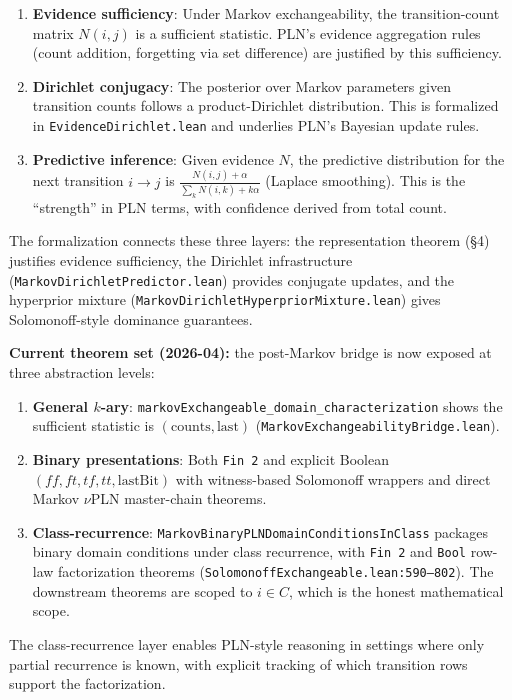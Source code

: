 \documentclass[11pt,a4paper]{article}
\theoremstyle{definition}
\begin{document}
\begin{enumerate}
\item \textbf{Evidence sufficiency}: Under Markov exchangeability,
  the transition-count matrix $N(i,j)$ is a sufficient statistic.
  PLN's evidence aggregation rules (count addition, forgetting via
  set difference) are justified by this sufficiency.
\item \textbf{Dirichlet conjugacy}: The posterior over Markov parameters
  given transition counts follows a product-Dirichlet distribution.
  This is formalized in \texttt{EvidenceDirichlet.lean} and underlies
  PLN's Bayesian update rules.
\item \textbf{Predictive inference}: Given evidence $N$, the predictive
  distribution for the next transition $i \to j$ is
  $\frac{N(i,j) + \alpha}{\sum_k N(i,k) + k\alpha}$ (Laplace smoothing).
  This is the ``strength'' in PLN terms, with confidence derived from
  total count.
\end{enumerate}

The formalization connects these three layers: the representation theorem
(\S4) justifies evidence sufficiency, the Dirichlet infrastructure
(\texttt{MarkovDirichletPredictor.lean}) provides conjugate updates,
and the hyperprior mixture (\texttt{MarkovDirichletHyperpriorMixture.lean})
gives Solomonoff-style dominance guarantees.

\medskip

\noindent\textbf{Current theorem set (2026-04):} the post-Markov bridge is
now exposed at three abstraction levels:
\begin{enumerate}
\item \textbf{General $k$-ary}: \texttt{markovExchangeable\_domain\_characterization}
  shows the sufficient statistic is $(\mathrm{counts}, \mathrm{last})$
  (\texttt{MarkovExchangeabilityBridge.lean}).
\item \textbf{Binary presentations}: Both \texttt{Fin 2} and explicit Boolean
  $(ff,ft,tf,tt,\mathrm{lastBit})$ with witness-based Solomonoff wrappers and
  direct Markov $\nu$PLN master-chain theorems.
\item \textbf{Class-recurrence}: \texttt{MarkovBinaryPLNDomainConditionsInClass}
  packages binary domain conditions under class recurrence, with
  \texttt{Fin 2} and \texttt{Bool} row-law factorization theorems
  (\texttt{SolomonoffExchangeable.lean:590--802}). The downstream theorems
  are scoped to $i \in C$, which is the honest mathematical scope.
\end{enumerate}
The class-recurrence layer enables PLN-style reasoning in settings where only
partial recurrence is known, with explicit tracking of which transition rows
support the factorization.
\end{document}
